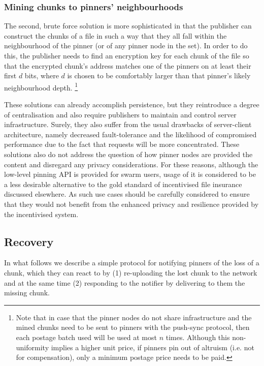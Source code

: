 \subsubsection{Mining chunks to pinners' neighbourhoods}

The second, brute force solution is more sophisticated in that the publisher can construct the chunks of a file in such a way that they all fall within the neighbourhood of the pinner (or of any pinner node in the set). In order to do this, the publisher needs to find an encryption key for each chunk of the file so that the encrypted chunk's address matches one of the pinners on at least their first $d$ bits, where $d$ is chosen to be comfortably larger than that pinner's likely neighbourhood depth.%
%
\footnote{Note that in case that the pinner nodes do not share infrastructure and the mined chunks need to be sent to pinners with the push-sync protocol, then each postage batch used will be used at most $n$ times. Although this non-uniformity implies a higher unit price, if pinners pin out of altruism (i.e. not for compensation), only a minimum postage price needs to be paid.
}

These solutions can already accomplish persistence, but they reintroduce a degree of centralisation and also require publishers to maintain and control server infrastructure. Surely, they also suffer from the usual drawbacks of server-client architecture, namely decreased fault-tolerance and the likelihood of compromised performance due to the fact that requests will be more concentrated. These solutions also do not address the question of how pinner nodes are provided the content and disregard any privacy considerations. For these reasons, although the low-level pinning API is provided for swarm users, usage of it is considered to be a less desirable alternative to the gold standard of incentivised file insurance discussed elsewhere. As such use cases should be carefully considered to ensure that they would not benefit from the enhanced privacy and resilience provided by the incentivised system.



\subsection{Recovery \statusyellow}\label{sec:recovery-chunks}


In what follows we describe a simple protocol for notifying pinners of the loss of a chunk, which they can react to by (1) re-uploading the lost chunk to the network and at the same time (2) responding to the notifier by delivering to them the missing chunk. 

